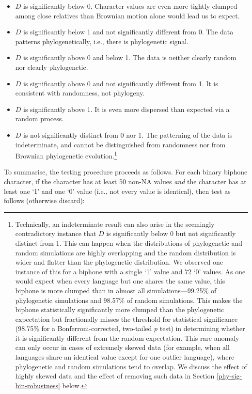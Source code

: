 \begin{itemize}
\tightlist
\item
  \(D\) is significantly below 0. Character values are even more tightly clumped among close relatives than Brownian motion alone would lead us to expect.
\item
  \(D\) is significantly below 1 and not significantly different from 0. The data patterns phylogenetically, i.e., there is phylogenetic signal.
\item
  \(D\) is significantly above 0 and below 1. The data is neither clearly random nor clearly phylogenetic.
\item
  \(D\) is significantly above 0 and not significantly different from 1. It is consistent with randomness, not phylogeny.
\item
  \(D\) is significantly above 1. It is even more dispersed than expected via a random process.
\item
  \(D\) is not significantly distinct from 0 nor 1. The patterning of the data is indeterminate, and cannot be distinguished from randomness nor from Brownian phylogenetic evolution.\footnote{Technically, an indeterminate result can also arise in the seemingly contradictory instance that \(D\) is significantly below 0 but not significantly distinct from 1. This can happen when the distributions of phylogenetic and random simulations are highly overlapping and the random distribution is wider and flatter than the phylogenetic distribution. We observed one instance of this for a biphone with a single `1' value and 72 `0' values. As one would expect when every language but one shares the same value, this biphone is more clumped than in almost all simulations---99.25\% of phylogenetic simulations and 98.57\% of random simulations. This makes the biphone statistically significantly more clumped than the phylogenetic expectation but fractionally misses the threshold for statistical significance (98.75\% for a Bonferroni-corrected, two-tailed \(p\) test) in determining whether it is significantly different from the random expectation. This rare anomaly can only occur in cases of extremely skewed data (for example, when all languages share an identical value except for one outlier language), where phylogenetic and random simulations tend to overlap. We discuss the effect of highly skewed data and the effect of removing such data in Section \ref{phy-sig-bin-robustness} below.}
\end{itemize}

To summarise, the testing procedure proceeds as follows. For each binary biphone character, if the character has at least 50 non-NA values \emph{and} the character has at least one `1' and one `0' value (i.e., not every value is identical), then test as follows (otherwise discard):

